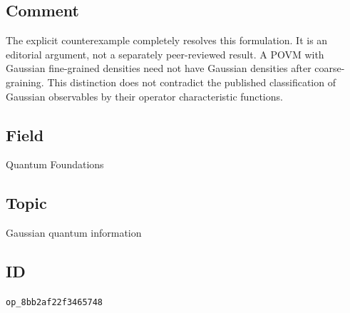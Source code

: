 \subsection*{Comment}

The explicit counterexample completely resolves this formulation. It is an editorial argument, not a separately peer-reviewed result. A POVM with Gaussian fine-grained densities need not have Gaussian densities after coarse-graining. This distinction does not contradict the published classification of Gaussian observables by their operator characteristic functions.

\subsection*{Field}

Quantum Foundations

\subsection*{Topic}

Gaussian quantum information

\subsection*{ID}

\texttt{op\_8bb2af22f3465748}

